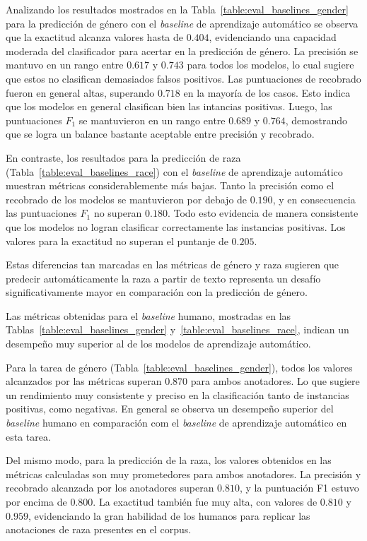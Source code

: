 Analizando los resultados mostrados en la Tabla~\ref{table:eval_baselines_gender} para la predicci\'on de g\'enero con el 
\emph{baseline} de aprendizaje autom\'atico se observa que la exactitud alcanza valores hasta de $0.404$, 
evidenciando una capacidad moderada del clasificador para acertar en la predicci\'on de g\'enero. La precisi\'on se 
mantuvo en un rango entre $0.617$ y $0.743$ para todos los modelos, lo cual sugiere que estos no
clasifican demasiados falsos positivos. Las puntuaciones de recobrado fueron en general altas, superando $0.718$
en la mayor\'ia de los casos. Esto indica que los modelos en general clasifican bien las intancias positivas. Luego, las 
puntuaciones $F_1$ se mantuvieron en un rango entre $0.689$ y $0.764$, demostrando que se logra
un balance bastante aceptable entre precisi\'on y recobrado.%

En contraste, los resultados para la predicci\'on de raza (Tabla~\ref{table:eval_baselines_race}) con el 
\emph{baseline} de aprendizaje autom\'atico muestran m\'etricas considerablemente m\'as bajas. Tanto la 
precisi\'on como el recobrado de los modelos se mantuvieron por debajo de $0.190$, y en consecuencia 
las puntuaciones $F_1$ no superan $0.180$. Todo esto evidencia de manera consistente que los modelos no 
logran clasificar correctamente las instancias positivas. Los valores para la exactitud no superan el puntanje 
de $0.205$. 

Estas diferencias tan marcadas en las m\'etricas de g\'enero y raza sugieren que predecir autom\'aticamente la 
raza a partir de texto representa un desaf\'io significativamente mayor en comparaci\'on con la predicci\'on de 
g\'enero. 

Las m\'etricas obtenidas para el \emph{baseline} humano, mostradas en las 
Tablas~\ref{table:eval_baselines_gender} y~\ref{table:eval_baselines_race}, indican un desempe\~no muy 
superior al de los modelos de aprendizaje autom\'atico. 

Para la tarea de g\'enero (Tabla~\ref{table:eval_baselines_gender}), todos los valores alcanzados
por las m\'etricas superan $0.870$ para ambos anotadores. Lo que sugiere un 
rendimiento muy consistente y preciso en la clasificaci\'on tanto de instancias positivas, 
como negativas. En general se observa un desempe\~no superior del 
\emph{baseline} humano en comparaci\'on com el \emph{baseline} de aprendizaje autom\'atico en 
esta tarea.

Del mismo modo, para la predicci\'on de la raza, los valores obtenidos en las m\'etricas calculadas son 
muy prometedores para ambos anotadores. La precisi\'on y 
recobrado alcanzada por los anotadores superan $0.810$, y la puntuaci\'on F1 estuvo 
por encima de $0.800$. La exactitud tambi\'en fue muy alta, con valores de $0.810$
y $0.959$, evidenciando la gran habilidad de los humanos para replicar las anotaciones
de raza presentes en el corpus.

